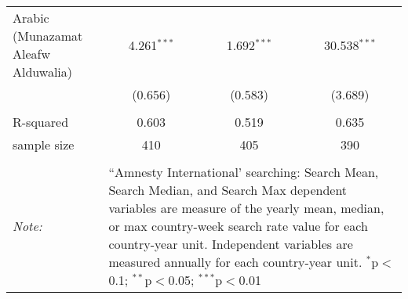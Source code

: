 \begin{table}[!htbp]
\begin{tabular}{@{\extracolsep{5pt}}lccc}
  Arabic (Munazamat Aleafw Alduwalia) & 4.261$^{***}$ & 1.692$^{***}$ & 30.538$^{***}$ \\ 
  & (0.656) & (0.583) & (3.689) \\ 
 \hline \\[-1.8ex] 
R-squared  & 0.603 & 0.519 & 0.635 \\ 
sample size  & 410 & 405 & 390 \\ 
\hline 
\hline \\[-1.8ex] 
\textit{Note:}  & \multicolumn{3}{l}{\parbox[t]{8cm}{``Amnesty International' searching: Search Mean, Search Median, and Search Max dependent variables are measure of the yearly mean, median, or max country-week search rate value for each country-year unit. Independent variables are measured annually for each country-year unit. $^{*}$p$<$0.1; $^{**}$p$<$0.05; $^{***}$p$<$0.01}} \\ 
\end{tabular} 
\end{table} 
